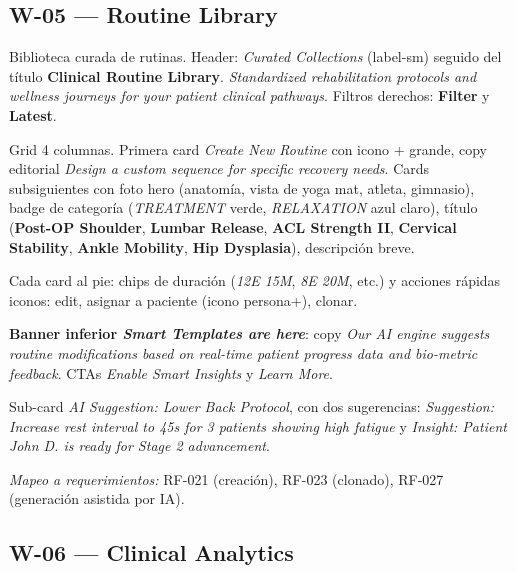 
\subsection{W-05 --- Routine Library}

Biblioteca curada de rutinas. Header: \textit{Curated Collections} (label-sm) seguido del título \textbf{Clinical Routine Library}. \textit{Standardized rehabilitation protocols and wellness journeys for your patient clinical pathways}. Filtros derechos: \textbf{Filter} y \textbf{Latest}.

Grid 4 columnas. Primera card \textit{Create New Routine} con icono + grande, copy editorial \textit{Design a custom sequence for specific recovery needs}. Cards subsiguientes con foto hero (anatomía, vista de yoga mat, atleta, gimnasio), badge de categoría (\textit{TREATMENT} verde, \textit{RELAXATION} azul claro), título (\textbf{Post-OP Shoulder}, \textbf{Lumbar Release}, \textbf{ACL Strength II}, \textbf{Cervical Stability}, \textbf{Ankle Mobility}, \textbf{Hip Dysplasia}), descripción breve.

Cada card al pie: chips de duración (\textit{12E 15M}, \textit{8E 20M}, etc.) y acciones rápidas iconos: edit, asignar a paciente (icono persona+), clonar.

\textbf{Banner inferior \textit{Smart Templates are here}}: copy \textit{Our AI engine suggests routine modifications based on real-time patient progress data and bio-metric feedback}. CTAs \textit{Enable Smart Insights} y \textit{Learn More}.

Sub-card \textit{AI Suggestion: Lower Back Protocol}, con dos sugerencias: \textit{Suggestion: Increase rest interval to 45s for 3 patients showing high fatigue} y \textit{Insight: Patient John D. is ready for Stage 2 advancement}.

\textit{Mapeo a requerimientos:} RF-021 (creación), RF-023 (clonado), RF-027 (generación asistida por IA).


\subsection{W-06 --- Clinical Analytics}

